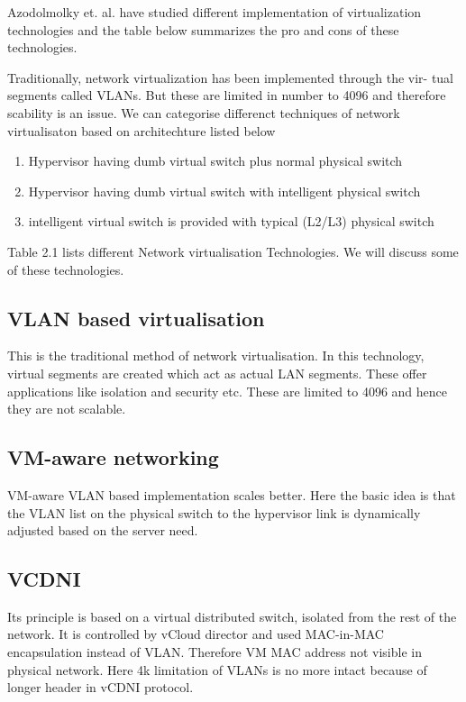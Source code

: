 Azodolmolky et. al. \cite{azodolmolky2013sdn} have studied different implementation of virtualization technologies and the table below summarizes the pro and cons of these technologies.

Traditionally, network virtualization has been implemented through the vir-
tual segments called VLANs. But these are limited in number to 4096 and
therefore scability is an issue.
We can categorise differenct techniques of network virtualisaton based on architechture listed below

\begin{enumerate}
    \item Hypervisor having dumb virtual switch plus normal physical switch
    \item Hypervisor having dumb virtual switch with intelligent physical switch
    \item intelligent virtual switch is provided with typical (L2/L3) physical switch
\end{enumerate}

Table 2.1 lists different Network virtualisation Technologies. We will discuss some of these technologies. 
\subsection{VLAN based virtualisation}
This is the traditional method of network virtualisation. In this technology, virtual segments are created which act as actual LAN segments. These offer applications like isolation and security etc. These are limited to 4096 and hence they are not scalable.

\subsection{VM-aware networking}
VM-aware VLAN based implementation scales better. Here the basic idea is
that the VLAN list on the physical switch to the hypervisor link is dynamically
adjusted based on the server need.

\subsection{VCDNI} Its principle is based on a virtual distributed switch, isolated from the rest of the network. It is controlled by vCloud director and used MAC-in-MAC encapsulation instead of VLAN. Therefore VM MAC address not visible in physical network. Here 4k limitation of VLANs is no more intact because of longer header in vCDNI protocol.


